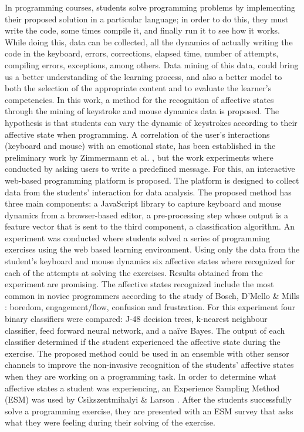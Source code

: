 \documentclass[a4paper]{llncs}
\begin{document}
In programming courses, students solve programming problems by implementing their
proposed solution in a particular language; in order to do this, they must write the code,
some times compile it, and finally run it to see how it works. 
While doing this, data can be collected, all the dynamics of actually writing 
the code in the keyboard, errors, corrections, elapsed time, number of attempts,
compiling errors, exceptions, among others. Data mining of this data, could
bring us a better understanding of the learning process, and also a better model to 
both the selection of the appropriate content and to evaluate the learner’s competencies.
In this work, a method for the recognition of affective states through the
mining of keystroke and mouse dynamics data is proposed. 
The hypothesis is that students can vary the dynamic of keystrokes according 
to their affective state when programming. A correlation of the 
user’s interactions (keyboard and mouse) with an emotional state, has been 
established in the preliminary work by Zimmermann
et al. \cite{zimmermann2003affective}, but the work experiments where
conducted by asking users to write a predefined message. 
For this, an interactive web-based programming platform
is proposed. The platform is designed to collect data from the students'
interaction for data analysis.
The proposed method
has three main components: a JavaScript library to capture keyboard and mouse
dynamics from a browser-based editor, a pre-processing step whose output is a
feature vector that is sent to the third component, a classification algorithm.
An experiment was conducted where students solved a series of programming
exercises using the web based learning environment. Using only the data from the
student’s keyboard and mouse dynamics six affective states where recognized for
each of the attempts at solving the exercises. Results obtained from the
experiment are promising. The affective states recognized include the most
common in novice programmers according to the study of Bosch, D'Mello \& Mills
\cite{bixler2013detecting}: boredom, engagement/flow, confusion and frustration. For this experiment
four binary classifiers were compared: J-48 decision trees, k-nearest neighbour
classifier, feed forward neural network, and a na\"ive Bayes. The output of each
classifier determined if the student experienced the affective state during the
exercise. The proposed method could be used in an ensemble with other sensor
channels to improve the non-invasive recognition of the students’ affective
states when they are working on a programming task. In order to determine what
affective states a student was experiencing, an Experience Sampling Method (ESM)
was used by Csikszentmihalyi \& Larson \cite{kubey1996experience}. After the students successfully
solve a programming exercise, they are presented with an ESM survey that asks
what they were feeling during their solving of the exercise.
\end{document}
